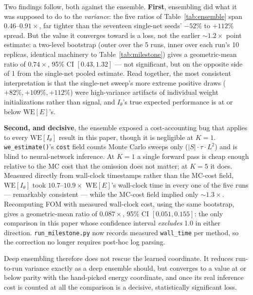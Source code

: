 \documentclass[a4paper,fleqn]{cas-sc}
\begin{document}
	Two findings follow, both against the ensemble. \textbf{First}, ensembling did what it was
	supposed to do to the \emph{variance}: the five ratios of Table~\ref{tab:ensemble} span $0.46$--$0.91\times$, far
	tighter than the seventeen single-net seeds' $-52\%$ to $+112\%$ spread. But the value it
	converges toward is a loss, not the earlier $\sim\!1.2\times$ point estimate: a two-level
	bootstrap (outer over the 5 runs, inner over each run's 10 replicas, identical machinery to
	Table~\ref{tab:milestone}) gives a geometric-mean ratio of $0.74\times$, 95\% CI
	$[0.43, 1.32]$ --- not significant, but on the opposite side of 1 from the single-net pooled
	estimate. Read together, the most consistent interpretation is that the single-net sweep's
	more extreme positive draws ($+82\%, +109\%, +112\%$) were high-variance artifacts of
	individual weight initializations rather than signal, and $I_\theta$'s true expected
	performance is at or below $\mathrm{WE}[E]$'s.
	
	\textbf{Second, and decisive}, the ensemble exposed a cost-accounting bug that applies to
	every $\mathrm{WE}[I_\theta]$ result in this paper, though it is negligible at $K=1$.
	\texttt{we\_estimate()}'s \texttt{cost} field counts Monte Carlo sweeps only
	($|S|\cdot\tau\cdot L^2$) and is blind to neural-network inference. At $K=1$ a single
	forward pass is cheap enough relative to the MC cost that the omission does not matter; at
	$K=5$ it does. Measured directly from wall-clock timestamps rather than the MC-cost field,
	$\mathrm{WE}[I_\theta]$ took $10.7$--$10.9\times$ $\mathrm{WE}[E]$'s wall-clock time in
	every one of the five runs --- remarkably consistent --- while the MC-cost field implied
	only $\sim\!1.3\times$. Recomputing FOM with measured wall-clock cost, using the same
	bootstrap, gives a geometric-mean ratio of $0.087\times$, 95\% CI $[0.051, 0.155]$: the only
	comparison in this paper whose confidence interval \emph{excludes} 1.0 in either direction.
	\texttt{run\_milestone.py} now records measured \texttt{wall\_time} per method, so the
	correction no longer requires post-hoc log parsing.
	
	Deep ensembling therefore does not rescue the learned coordinate. It reduces run-to-run
	variance exactly as a deep ensemble should, but converges to a value at or below parity with
	the hand-picked energy coordinate, and once its real inference cost is counted at all the
	comparison is a decisive, statistically significant loss.
	
\end{document}
